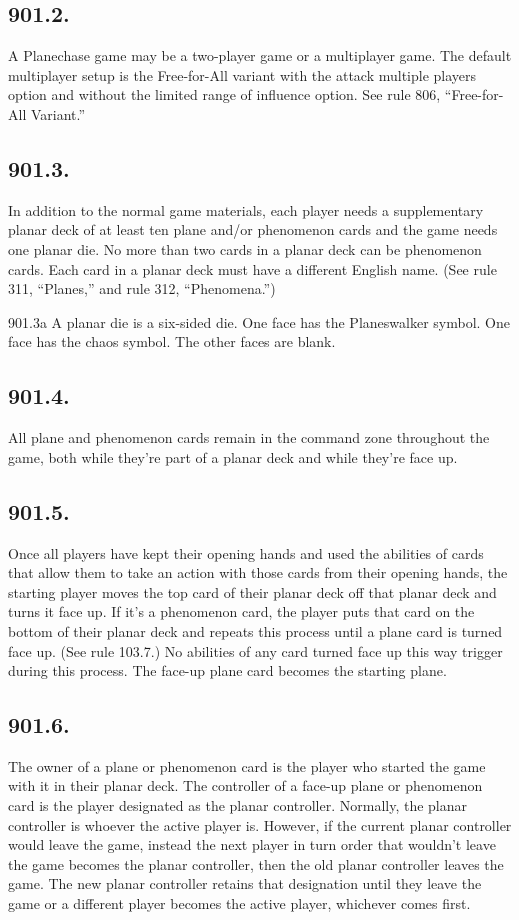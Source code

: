 \subsection*{901.2.}
A Planechase game may be a two-player game or a multiplayer game. The default multiplayer setup is the Free-for-All variant with the attack multiple players option and without the limited range of influence option. See rule 806, “Free-for-All Variant.”

\subsection*{901.3.}
In addition to the normal game materials, each player needs a supplementary planar deck of at least ten plane and/or phenomenon cards and the game needs one planar die. No more than two cards in a planar deck can be phenomenon cards. Each card in a planar deck must have a different English name. (See rule 311, “Planes,” and rule 312, “Phenomena.”)

901.3a A planar die is a six-sided die. One face has the Planeswalker symbol. One face has the chaos symbol. The other faces are blank.

\subsection*{901.4.}
All plane and phenomenon cards remain in the command zone throughout the game, both while they’re part of a planar deck and while they’re face up.

\subsection*{901.5.}
Once all players have kept their opening hands and used the abilities of cards that allow them to take an action with those cards from their opening hands, the starting player moves the top card of their planar deck off that planar deck and turns it face up. If it’s a phenomenon card, the player puts that card on the bottom of their planar deck and repeats this process until a plane card is turned face up. (See rule 103.7.) No abilities of any card turned face up this way trigger during this process. The face-up plane card becomes the starting plane.

\subsection*{901.6.}
The owner of a plane or phenomenon card is the player who started the game with it in their planar deck. The controller of a face-up plane or phenomenon card is the player designated as the planar controller. Normally, the planar controller is whoever the active player is. However, if the current planar controller would leave the game, instead the next player in turn order that wouldn’t leave the game becomes the planar controller, then the old planar controller leaves the game. The new planar controller retains that designation until they leave the game or a different player becomes the active player, whichever comes first.

